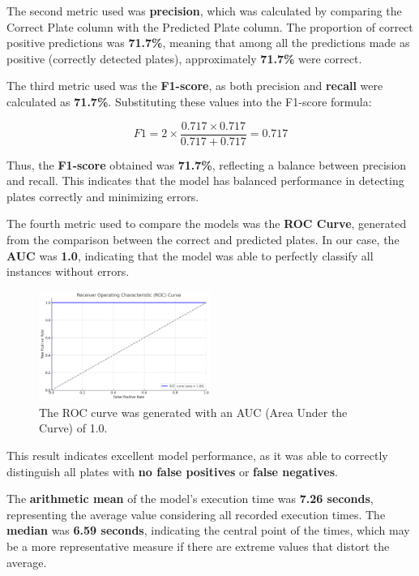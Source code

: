 \documentclass[conference]{IEEEtran}
\begin{document}
	The second metric used was \textbf{precision}, which was calculated by comparing the Correct Plate column with the Predicted Plate column. The proportion of correct positive predictions was \textbf{71.7\%}, meaning that among all the predictions made as positive (correctly detected plates), approximately \textbf{71.7\%} were correct.
	
	The third metric used was the \textbf{F1-score}, as both precision and \textbf{recall} were calculated as \textbf{71.7\%}. Substituting these values into the F1-score formula:
	
	\[
	F1 = 2 \times \frac{0.717 \times 0.717}{0.717 + 0.717} = 0.717
	\]
	
	Thus, the \textbf{F1-score} obtained was \textbf{71.7\%}, reflecting a balance between precision and recall. This indicates that the model has balanced performance in detecting plates correctly and minimizing errors.
	
	The fourth metric used to compare the models was the \textbf{ROC Curve}, generated from the comparison between the correct and predicted plates. In our case, the \textbf{AUC} was \textbf{1.0}, indicating that the model was able to perfectly classify all instances without errors. 
	
	\begin{figure}[htbp]
		\centerline{\includegraphics[width=0.5\textwidth]{img4.png}}
		\caption{The ROC curve was generated with an AUC (Area Under the Curve) of 1.0.}
		\label{img4}
	\end{figure}
	
	This result indicates excellent model performance, as it was able to correctly distinguish all plates with \textbf{no false positives} or \textbf{false negatives}.
	
	The \textbf{arithmetic mean} of the model's execution time was \textbf{7.26 seconds}, representing the average value considering all recorded execution times. The \textbf{median} was \textbf{6.59 seconds}, indicating the central point of the times, which may be a more representative measure if there are extreme values that distort the average.
	
\end{document}

